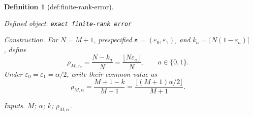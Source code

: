 \documentclass{article}
\newtheorem{definition}{Definition}
\begin{document}
\begin{definition}[def:finite-rank-error]\label{def:finite-rank-error}
\par\smallskip\noindent\emph{Defined object.} \texttt{exact finite-\allowbreak{}rank error}
\par\smallskip\noindent\emph{Construction.} For \(N=M+1\), prespecified \(\boldsymbol\varepsilon=(\varepsilon_0,\varepsilon_1)\), and \(k_a=\lceil N(1-\varepsilon_a)\rceil\), define
\[
\rho_{M,\varepsilon_a}=\frac{N-k_a}{N}=\frac{\lfloor N\varepsilon_a\rfloor}{N},\qquad a\in\{0,1\}.
\]
Under \(\varepsilon_0=\varepsilon_1=\alpha/2\), write their common value as
\[
\rho_{M,\alpha}=\frac{M+1-k}{M+1}=\frac{\lfloor(M+1)\alpha/2\rfloor}{M+1}.
\]
\par\smallskip\noindent\emph{Inputs.} \(M\); \(\alpha\); \(k\); \(\rho_{M,\alpha}\).
\end{definition}
\end{document}
